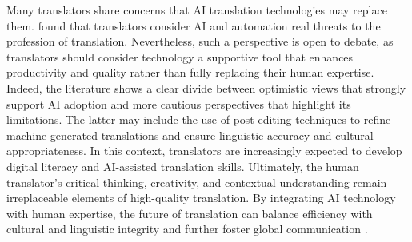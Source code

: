 \documentclass[english]{textolivre}
\begin{document}
Many translators share concerns that AI translation technologies may replace them. \textcite{KirovMalamin2022TranslatorsAI} found that translators consider AI and automation real threats to the profession of translation. Nevertheless, such a perspective is open to debate, as translators should consider technology a supportive tool that enhances productivity and quality rather than fully replacing their human expertise. Indeed, the literature shows a clear divide between optimistic views that strongly support AI adoption and more cautious perspectives that highlight its limitations. The latter may include the use of post-editing techniques to refine machine-generated translations and ensure linguistic accuracy and cultural appropriateness. In this context, translators are increasingly expected to develop digital literacy and AI-assisted translation skills. Ultimately, the human translator’s critical thinking, creativity, and contextual understanding remain irreplaceable elements of high-quality translation. By integrating AI technology with human expertise, the future of translation can balance efficiency with cultural and linguistic integrity and further foster global communication \cite{Shahmerdanova2025AITranslation}.
\end{document}
